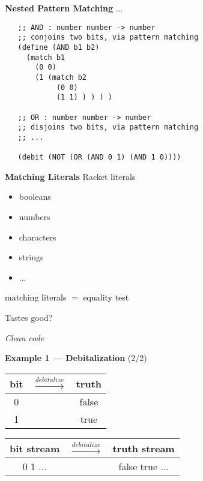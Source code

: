 \documentclass[14pt]{beamer}
\newcommand{\hl}[1]{\textcolor{black}{#1}}
\begin{document}
\begin{frame}[fragile]{\bf Nested Pattern Matching}
 ...

 {\footnotesize
  \begin{verbatim}
   ;; AND : number number -> number
   ;; conjoins two bits, via pattern matching
   (define (AND b1 b2)
     (match b1
       (0 0)
       (1 (match b2
            (0 0)
            (1 1) ) ) ) )

   ;; OR : number number -> number
   ;; disjoins two bits, via pattern matching
   ;; ...

   (debit (NOT (OR (AND 0 1) (AND 1 0))))
  \end{verbatim}
 }
\end{frame}

\begin{frame}{\bf Matching Literals}
 Racket literals
 \begin{itemize}
  \item booleans
  \item numbers
  \pause
  \item characters
  \pause
  \item strings
  \item ...
 \end{itemize}

 \pause

 \hl{matching literals $=$ equality test}
\end{frame}

\begin{frame}[plain]
 \begin{center}
  {\LARGE
   Tastes good?
 
   \pause

   \em
   Clean code
  }
 \end{center}
\end{frame}

\begin{frame}[fragile]{{\bf Example 1 --- Debitalization} (2/2)}
 \large
 \begin{table}
  \centering
  \begin{tabular}{ccc}
   bit & $\overset{debitalize}{\longrightarrow}$ & truth \\
   \hline
   0   &                                         & false \\
   1   &                                         & true  \\
  \end{tabular}
 \end{table}

 \pause

 \begin{table}
  \centering
  \begin{tabular}{ccc}
   bit stream & $\overset{debitalize}{\longrightarrow}$ & truth stream   \\
   \hline
   0 1 ...    &                                         & false true ...
  \end{tabular}
 \end{table}
\end{frame}
\end{document}
